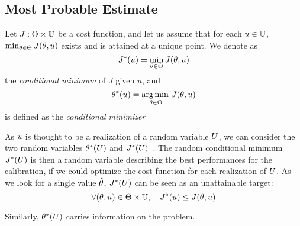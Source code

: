 \documentclass[../../Main_ManuscritThese.tex]{subfiles}
\begin{document}
\subsection{Most Probable Estimate}
\label{sec:MPE}
\begin{definition}
  Let $J: \Theta \times \mathbb{U}$ be a cost function, and let us assume that for each $u \in \mathbb{U}$, $\min_{\theta \in \Theta} J(\theta,u)$ exists and is attained at a unique point.
  We denote as
  \begin{equation}
    J^*(u) = \min_{\theta \in \Theta} J(\theta,u)
  \end{equation}
  the \emph{conditional minimum} of $J$ given $u$, and
  \begin{equation}
    \theta^*(u) = \operatorname*{arg\,min \,}_{\theta\in\Theta} J(\theta, u)
  \end{equation}
 is defined as the \emph{conditional minimizer}
\end{definition}
As $u$ is thought to be a realization of a random variable $U$, we can consider the two random variables $\theta^*(U)$ and $J^*(U)$~\cite{trappler_robust_2020}.
The random conditional minimum $J^*(U)$ is then a random variable describing the best performances for the calibration, if we could optimize the cost function for each realization of $U$. As we look for a single value $\hat{\theta}$, $J^*(U)$ can be seen as an unattainable target:
\begin{equation}
  \forall (\theta,u) \in \Theta \times \mathbb{U}, \quad J^*(u) \leq J(\theta, u)
\end{equation}

Similarly, $\theta^*(U)$ carries information on the problem. 

\subfileLocal{
	\pagestyle{empty}
	
	
      }
\end{document}
